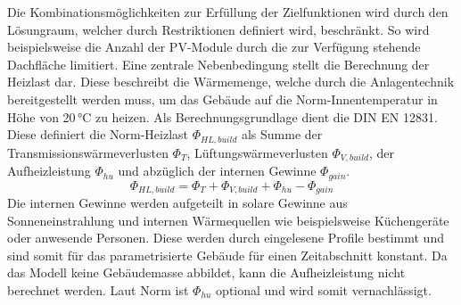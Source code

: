 Die Kombinationsmöglichkeiten zur Erfüllung der Zielfunktionen wird durch den Lösungraum, welcher durch Restriktionen definiert wird, beschränkt.
So wird beispielsweise die Anzahl der PV-Module durch die zur Verfügung stehende Dachfläche limitiert.
Eine zentrale Nebenbedingung stellt die Berechnung der Heizlast dar.
Diese beschreibt die Wärmemenge, welche durch die Anlagentechnik bereitgestellt werden muss, um das Gebäude auf die Norm-Innentemperatur in Höhe von 20\,°C zu heizen.
Als Berechnungsgrundlage dient die DIN EN 12831.
Diese definiert die Norm-Heizlast \(\Phi_{HL, build}\) als Summe der Transmissionswärmeverlusten \(\Phi_T\), Lüftungswärmeverlusten \(\Phi_{V, build}\), der Aufheizleistung \(\Phi_{hu}\) und abzüglich der internen Gewinne \(\Phi_{gain}\).
\begin{equation}
\label{eq:Gleichung2623}
\Phi_{HL, build} = \Phi_T + \Phi_{V, build} + \Phi_{hu} - \Phi_{gain}
\end{equation}
Die internen Gewinne werden aufgeteilt in solare Gewinne aus Sonneneinstrahlung und internen Wärmequellen wie beispielsweise Küchengeräte oder anwesende Personen.
Diese werden durch eingelesene Profile bestimmt und sind somit für das parametrisierte Gebäude für einen Zeitabschnitt konstant.
Da das Modell keine Gebäudemasse abbildet, kann die Aufheizleistung nicht berechnet werden.
Laut Norm ist \(\Phi_{hu}\) optional und wird somit vernachlässigt.

